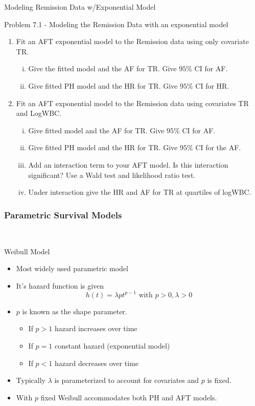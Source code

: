 \documentclass{beamer}
\theoremstyle{definition}
\begin{document}
 \begin{frame}{Modeling Remission Data w/Exponential Model}
\begin{block}{Problem 7.1 - Modeling the Remission Data with an exponential model}
\begin{enumerate}
\item Fit an AFT exponential model to the Remission data using only covariate TR.
\begin{enumerate}[i.]
\item Give the fitted model and the AF for TR. Give $95\%$ CI for AF.
\item Give fitted PH model and the HR  for TR. Give $95\%$ CI for HR.
\end{enumerate}
\item Fit an AFT exponential model to the Remission data using covariates TR and LogWBC.
\begin{enumerate}[i.]
\item Give fitted model and the AF for TR. Give $95\%$ CI for AF.
\item Give fitted PH model and the HR for TR. Give $95\%$ CI for the AF.
\item Add an interaction term to your AFT model. Is this interaction significant? Use a Wald test and likelihood ratio test.
\item Under interaction give the HR and AF for TR at quartiles of logWBC.
\end{enumerate}
\end{enumerate}
 \end{block}
 \end{frame}

\begin{frame}
\frametitle{Parametric Survival Models}\
\begin{block}{Weibull Model}
\begin{itemize}
\item Most widely used parametric model
\item It's hazard function is given
\[ h(t) = \lambda p t^{p-1} \text{ with } p>0, \lambda >0
\]
\item $p$ is known as the shape parameter.
\begin{itemize}
\item If $p>1$ hazard increases over time
\item If $p=1$ constant hazard (exponential model)
\item If $p<1$ hazard decreases over time
\end{itemize}
\item Typically $\lambda$ is parameterized to account for covariates and $p$ is fixed.
\item With $p$ fixed Weibull accommodates both PH and AFT models.
\end{itemize}
\end{block}
\end{frame}
\end{document}
